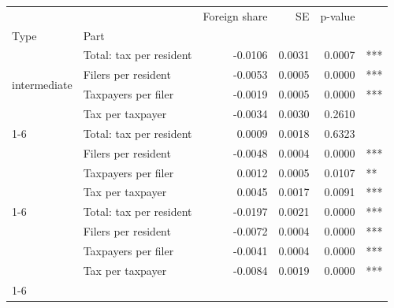 \begin{tabular}{llrrrl}
\toprule
 &  & Foreign share & SE & p-value &  \\
Type & Part &  &  &  &  \\
\midrule
\multirow[t]{4}{*}{intermediate} & Total: tax per resident & -0.0106 & 0.0031 & 0.0007 & *** \\
 & Filers per resident & -0.0053 & 0.0005 & 0.0000 & *** \\
 & Taxpayers per filer & -0.0019 & 0.0005 & 0.0000 & *** \\
 & Tax per taxpayer & -0.0034 & 0.0030 & 0.2610 &  \\
\cline{1-6}
\multirow[t]{4}{*}{rural} & Total: tax per resident & 0.0009 & 0.0018 & 0.6323 &  \\
 & Filers per resident & -0.0048 & 0.0004 & 0.0000 & *** \\
 & Taxpayers per filer & 0.0012 & 0.0005 & 0.0107 & ** \\
 & Tax per taxpayer & 0.0045 & 0.0017 & 0.0091 & *** \\
\cline{1-6}
\multirow[t]{4}{*}{urban} & Total: tax per resident & -0.0197 & 0.0021 & 0.0000 & *** \\
 & Filers per resident & -0.0072 & 0.0004 & 0.0000 & *** \\
 & Taxpayers per filer & -0.0041 & 0.0004 & 0.0000 & *** \\
 & Tax per taxpayer & -0.0084 & 0.0019 & 0.0000 & *** \\
\cline{1-6}
\bottomrule
\end{tabular}
